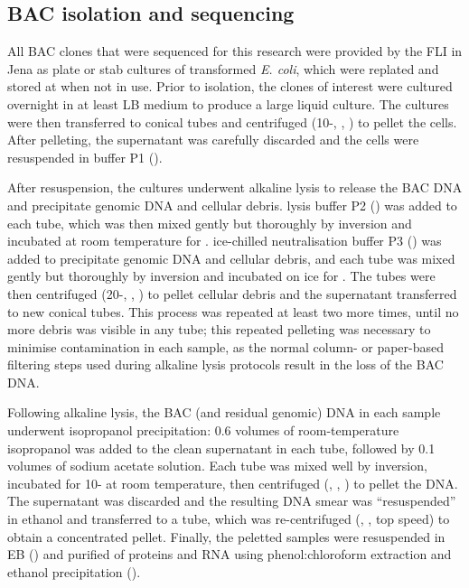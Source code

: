 \subsection{BAC isolation and sequencing}
\label{sec:methods_molec_bacs}

All BAC clones that were sequenced for this research were provided by the FLI in Jena as plate or stab cultures of transformed \textit{E. coli}, which were replated and stored at  when not in use. Prior to isolation, the clones of interest were cultured overnight in at least  LB medium to produce a large liquid culture. The cultures were then transferred to  conical tubes and centrifuged (10-, , ) to pellet the cells. After pelleting, the supernatant was carefully discarded and the cells were resuspended in  buffer P1 ().

After resuspension, the cultures underwent alkaline lysis \parencite{birnboim1979alkalinelysis} to release the BAC DNA and precipitate genomic DNA and cellular debris.  lysis buffer P2 () was added to each tube, which was then mixed gently but thoroughly by inversion and incubated at room temperature for .  ice-chilled neutralisation buffer P3 () was added to precipitate genomic DNA and cellular debris, and each tube was mixed gently but thoroughly by inversion and incubated on ice for . The tubes were then centrifuged (20-, , ) to pellet cellular debris and the supernatant transferred to new conical tubes. This process was repeated at least two more times, until no more debris was visible in any tube; this repeated pelleting was necessary to minimise contamination in each sample, as the normal column- or paper-based filtering steps used during alkaline lysis protocols result in the loss of the BAC DNA.

Following alkaline lysis, the BAC (and residual genomic) DNA in each sample underwent isopropanol precipitation: 0.6 volumes of room-temperature isopropanol was added to the clean supernatant in each tube, followed by 0.1 volumes of  sodium acetate solution. Each tube was mixed well by inversion, incubated for 10- at room temperature, then centrifuged (, , ) to pellet the DNA. The supernatant was discarded and the resulting DNA smear was ``resuspended'' in   ethanol and transferred to a  tube, which was re-centrifuged (, , top speed) to obtain a concentrated pellet. Finally, the peletted samples were resuspended in EB () and purified of proteins and RNA using phenol:chloroform extraction and ethanol precipitation ().


